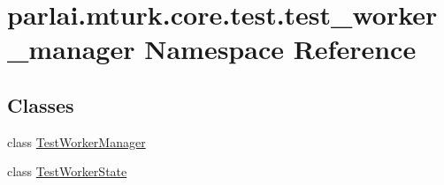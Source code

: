 \hypertarget{namespaceparlai_1_1mturk_1_1core_1_1test_1_1test__worker__manager}{}\section{parlai.\+mturk.\+core.\+test.\+test\+\_\+worker\+\_\+manager Namespace Reference}
\label{namespaceparlai_1_1mturk_1_1core_1_1test_1_1test__worker__manager}
\subsection*{Classes}
\begin{DoxyCompactItemize}
\item 
class \hyperlink{classparlai_1_1mturk_1_1core_1_1test_1_1test__worker__manager_1_1TestWorkerManager}{Test\+Worker\+Manager}
\item 
class \hyperlink{classparlai_1_1mturk_1_1core_1_1test_1_1test__worker__manager_1_1TestWorkerState}{Test\+Worker\+State}
\end{DoxyCompactItemize}
